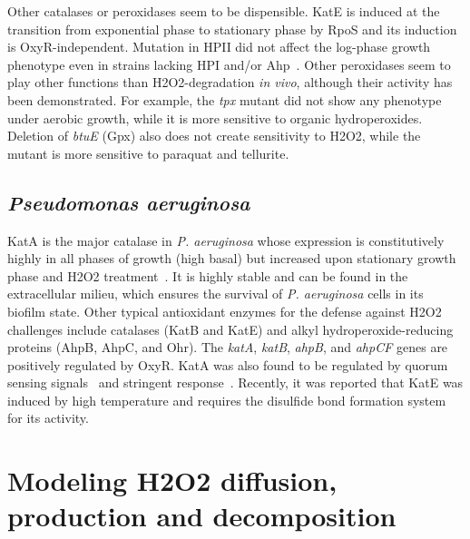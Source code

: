 \documentclass[10pt]{article}
\begin{document}
Other catalases or peroxidases seem to be dispensible. KatE is induced at the transition from exponential phase to stationary phase by RpoS and its induction is OxyR-independent. Mutation in HPII did not affect the log-phase growth phenotype even in strains lacking HPI and/or Ahp~\cite{seaver2001alkyl}. Other peroxidases seem to play other functions than H2O2-degradation \textit{in vivo}, although their activity has been demonstrated. For example, the \textit{tpx} mutant did not show any phenotype under aerobic growth, while it is more sensitive to organic hydroperoxides. Deletion of \textit{btuE} (Gpx) also does not create sensitivity to H2O2, while the mutant is more sensitive to paraquat and tellurite.

\subsection{\textit{Pseudomonas aeruginosa}}

KatA is the major catalase in \textit{P. aeruginosa} whose expression is constitutively highly in all phases of growth (high basal) but increased upon stationary growth phase and H2O2 treatment~\cite{heo2010major}. It is highly stable and can be found in the extracellular milieu, which ensures the survival of \textit{P. aeruginosa} cells in its biofilm state. Other typical antioxidant enzymes for the defense against H2O2 challenges include catalases (KatB and KatE) and alkyl hydroperoxide-reducing proteins (AhpB, AhpC, and Ohr). The \textit{katA}, \textit{katB}, \textit{ahpB}, and \textit{ahpCF} genes are positively regulated by OxyR. KatA was also found to be regulated by quorum sensing signals~\cite{hassett1999quorum} and stringent response~\cite{khakimova2013stringent}. Recently, it was reported that KatE was induced by high temperature and requires the disulfide bond formation system for its activity.

\clearpage
\section{Modeling H2O2 diffusion, production and decomposition}
\end{document}
